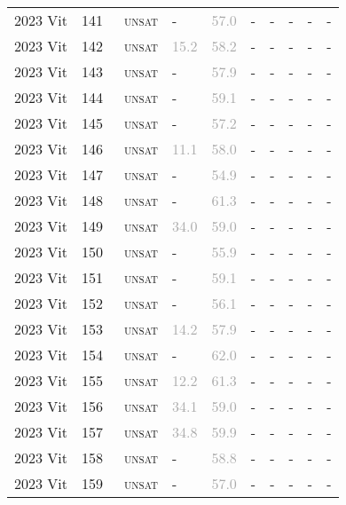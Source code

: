 \begin{center}
{\begin{longtable}{@{}llllllllll@{}}
2023 Vit & 141 & ~\textsc{unsat} & - & \textcolor{darkgray}{57.0} & - & - & - & - & - \\
2023 Vit & 142 & ~\textsc{unsat} & \textcolor{darkgray}{15.2} & \textcolor{darkgray}{58.2} & - & - & - & - & - \\
2023 Vit & 143 & ~\textsc{unsat} & - & \textcolor{darkgray}{57.9} & - & - & - & - & - \\
2023 Vit & 144 & ~\textsc{unsat} & - & \textcolor{darkgray}{59.1} & - & - & - & - & - \\
2023 Vit & 145 & ~\textsc{unsat} & - & \textcolor{darkgray}{57.2} & - & - & - & - & - \\
2023 Vit & 146 & ~\textsc{unsat} & \textcolor{darkgray}{11.1} & \textcolor{darkgray}{58.0} & - & - & - & - & - \\
2023 Vit & 147 & ~\textsc{unsat} & - & \textcolor{darkgray}{54.9} & - & - & - & - & - \\
2023 Vit & 148 & ~\textsc{unsat} & - & \textcolor{darkgray}{61.3} & - & - & - & - & - \\
2023 Vit & 149 & ~\textsc{unsat} & \textcolor{darkgray}{34.0} & \textcolor{darkgray}{59.0} & - & - & - & - & - \\
2023 Vit & 150 & ~\textsc{unsat} & - & \textcolor{darkgray}{55.9} & - & - & - & - & - \\
2023 Vit & 151 & ~\textsc{unsat} & - & \textcolor{darkgray}{59.1} & - & - & - & - & - \\
2023 Vit & 152 & ~\textsc{unsat} & - & \textcolor{darkgray}{56.1} & - & - & - & - & - \\
2023 Vit & 153 & ~\textsc{unsat} & \textcolor{darkgray}{14.2} & \textcolor{darkgray}{57.9} & - & - & - & - & - \\
2023 Vit & 154 & ~\textsc{unsat} & - & \textcolor{darkgray}{62.0} & - & - & - & - & - \\
2023 Vit & 155 & ~\textsc{unsat} & \textcolor{darkgray}{12.2} & \textcolor{darkgray}{61.3} & - & - & - & - & - \\
2023 Vit & 156 & ~\textsc{unsat} & \textcolor{darkgray}{34.1} & \textcolor{darkgray}{59.0} & - & - & - & - & - \\
2023 Vit & 157 & ~\textsc{unsat} & \textcolor{darkgray}{34.8} & \textcolor{darkgray}{59.9} & - & - & - & - & - \\
2023 Vit & 158 & ~\textsc{unsat} & - & \textcolor{darkgray}{58.8} & - & - & - & - & - \\
2023 Vit & 159 & ~\textsc{unsat} & - & \textcolor{darkgray}{57.0} & - & - & - & - & - \\

\end{longtable}}
\end{center}
